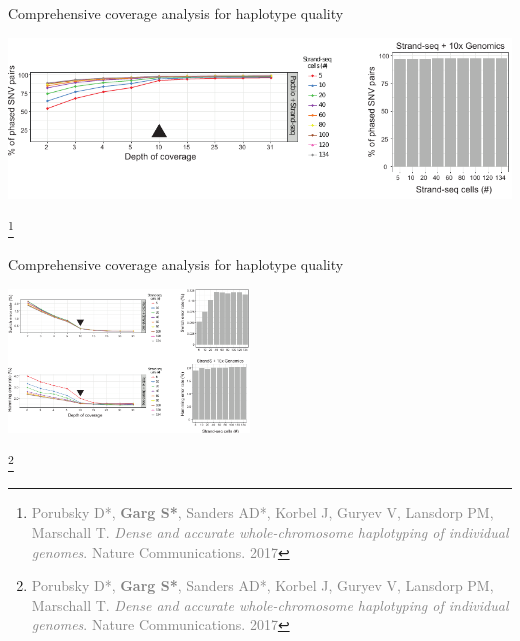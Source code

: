 \documentclass[notes=hide]{beamer}
\begin{document}
\begin{frame}{Comprehensive coverage analysis for haplotype quality}
\begin{center}
\includegraphics[width=\textwidth]{figs/Figure3_1}
\end{center}
\let\thefootnote\relax\footnote{\tiny\textcolor{gray}{Porubsky D*, \textbf{Garg S*}, Sanders AD*, Korbel J, Guryev V, Lansdorp PM, Marschall T. \textit{Dense and accurate whole-chromosome haplotyping of individual genomes}. Nature Communications. 2017}}

\end{frame}

\begin{frame}{Comprehensive coverage analysis for haplotype quality}
\begin{center}
\includegraphics[width=.9\textwidth, height = 144]{figs/Figure3_5}
\end{center}
\let\thefootnote\relax\footnote{\tiny\textcolor{gray}{Porubsky D*, \textbf{Garg S*}, Sanders AD*, Korbel J, Guryev V, Lansdorp PM, Marschall T. \textit{Dense and accurate whole-chromosome haplotyping of individual genomes}. Nature Communications. 2017}}

\end{frame}
\end{document}
